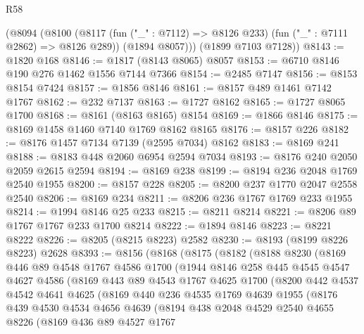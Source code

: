 \begin{lexlean}{R58}
\begin{coremodule}
      (@8094
        (@8100
          (@8117 (fun ("_" : @7112) => @8126 @233) (fun ("_" : @7111 @2862) => @8126 @289))
          (@1894 @8057)))
      (@1899 @7103 @7128))
@8143 := @1820 @168
@8146 := @1817 (@8143 @8065) @8057
@8153 := @6710 @8146 @190 @276 @1462 @1556 @7144 @7366
@8154 := @2485 @7147
@8156 := @8153 @8154 @7424
@8157 := @1856 @8146
@8161 := @8157 @489 @1461 @7142 @1767
@8162 := @232 @7137
@8163 := @1727 @8162
@8165 := @1727 @8065 @1700
@8168 := @8161 (@8163 @8165) @8154
@8169 := @1866 @8146
@8175 := @8169 @1458 @1460 @7140 @1769 @8162 @8165
@8176 := @8157 @226
@8182 := @8176 @1457 @7134 @7139 (@2595 @7034) @8162
@8183 := @8169 @241
@8188 := @8183 @448 @2060 @6954 @2594 @7034
@8193 := @8176 @240 @2050 @2059 @2615 @2594
@8194 := @8169 @238
@8199 := @8194 @236 @2048 @1769 @2540 @1955
@8200 := @8157 @228
@8205 := @8200 @237 @1770 @2047 @2558 @2540
@8206 := @8169 @234
@8211 := @8206 @236 @1767 @1769 @233 @1955
@8214 := @1994 @8146 @25 @233
@8215 := @8211 @8214
@8221 := @8206 @89 @1767 @1767 @233 @1700 @8214
@8222 := @1894 @8146
@8223 := @8221 @8222
@8226 := @8205 (@8215 @8223) @2582
@8230 := @8193 (@8199 @8226 @8223) @2628
@8393 := @8156
    (@8168
      (@8175
        (@8182
          (@8188
            @8230
            (@8169
              @446
              @89
              @4548
              @1767
              @4586
              @1700
              (@1944
                @8146
                @258
                @445
                @4545
                @4547
                @4627
                @4586
                (@8169
                  @443
                  @89
                  @4543
                  @1767
                  @4625
                  @1700
                  (@8200
                    @442
                    @4537
                    @4542
                    @4641
                    @4625
                    (@8169
                      @440
                      @236
                      @4535
                      @1769
                      @4639
                      @1955
                      (@8176
                        @439
                        @4530
                        @4534
                        @4656
                        @4639
                        (@8194
                          @438
                          @2048
                          @4529
                          @2540
                          @4655
                          @8226
                          (@8169
                            @436
                            @89
                            @4527
                            @1767

\end{coremodule}
\end{lexlean}
